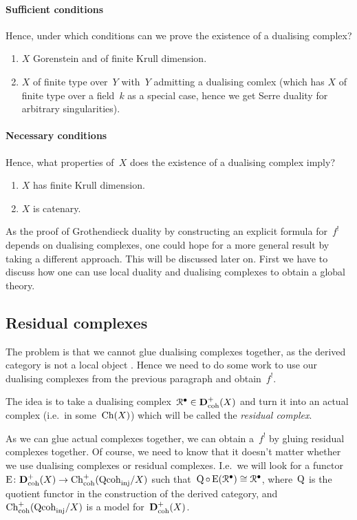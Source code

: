 \documentclass[10pt,a4paper]{article}
\begin{document}
\paragraph{Sufficient conditions}
Hence, under which conditions can we prove the existence of a dualising complex?
\begin{enumerate}
  \item $X$ Gorenstein and of finite Krull dimension.
  \item $X$ of finite type over~$Y$ with~$Y$ admitting a dualising comlex (which has $X$ of finite type over a field~$k$ as a special case, hence we get Serre duality for arbitrary singularities).
\end{enumerate}
\paragraph{Necessary conditions}
Hence, what properties of~$X$ does the existence of a dualising complex imply?
\begin{enumerate}
  \item $X$ has finite Krull dimension.
  \item $X$ is catenary.
\end{enumerate}
As the proof of Grothendieck duality by constructing an explicit formula for~$f^!$ depends on dualising complexes, one could hope for a more general result by taking a different approach. This will be discussed later on. First we have to discuss how one can use local duality and dualising complexes to obtain a global theory.


\subsection{Residual complexes}
The problem is that we cannot glue dualising complexes together, as the derived category is not a local object \addreference. Hence we need to do some work to use our dualising complexes from the previous paragraph and obtain~$f^!$.

The idea is to take a dualising complex~$\mathcal{R}^\bullet\in\mathbf{D}_{\mathrm{coh}}^+(X)$ and turn it into an actual complex (i.e.\ in some~$\operatorname{Ch}(X)$) which will be called the \emph{residual complex}.

As we can glue actual complexes together, we can obtain a~$f^!$ by gluing residual complexes together. Of course, we need to know that it doesn't matter whether we use dualising complexes or residual complexes. I.e.\ we will look for a functor~$\operatorname{E}\colon\mathbf{D}_{\mathrm{coh}}^+(X)\to\operatorname{Ch}_{\mathrm{coh}}^+(\mathrm{Qcoh}_{\mathrm{inj}}/X)$ such that~$\operatorname{Q}\circ\operatorname{E}(\mathcal{R}^\bullet)\cong\mathcal{R}^\bullet$, where~$\operatorname{Q}$ is the quotient functor in the construction of the derived category, and~$\operatorname{Ch}_{\mathrm{coh}}^+(\mathrm{Qcoh}_{\mathrm{inj}}/X)$ is a model for~$\mathbf{D}_{\mathrm{coh}}^+(X)$.
\end{document}
